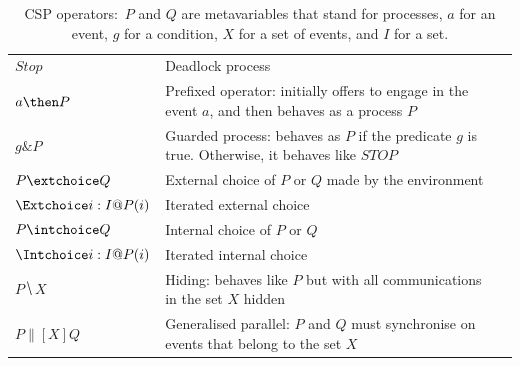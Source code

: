 \documentclass[3p,times]{elsarticle}
\begin{document}
\begin{table}\centering
  \begin{tabular}{|l|l|l|}
    \hline
  	$Stop$ & Deadlock process
    \\
  	$a \then P$ & Prefixed operator: initially offers to engage in the event $a$, and then behaves as a process $P$
    \\
  	$g \& P$ & Guarded process: behaves as $P$ if the predicate $g$ is true. Otherwise, it behaves like $STOP$
    \\
  	$P \extchoice Q$ & External choice of $P$ or $Q$ made by the environment
    \\
    $\Extchoice i: I @ P(i)$ & Iterated external choice
    \\
  	$P \intchoice Q$ & Internal choice of $P$ or $Q$
    \\
    $\Intchoice i: I @ P(i)$ & Iterated internal choice
    \\
  	$P \hide X $ & Hiding: behaves like $P$ but with all communications in the set $X$ hidden
    \\
  	$P \parallel[X] Q $ & Generalised parallel: $P$ and $Q$ must synchronise on events that belong to the set $X$
    \\
    \hline
  \end{tabular}
  \caption{{CSP operators:~$P$ and $Q$ are metavariables that stand for processes, $a$ for an event, $g$ for a condition, $X$ for a set of events, and $I$ for a set.}}
  \label{table:operators}
\end{table}
\end{document}
